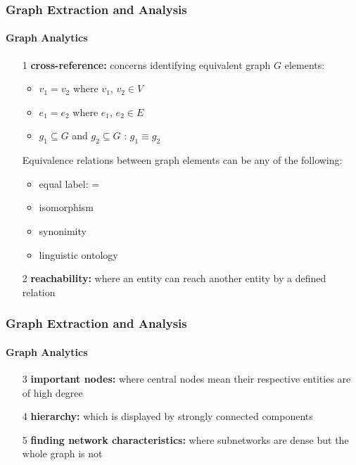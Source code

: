 \documentclass[xcolor=table]{beamer}
\begin{document}
\begin{frame}
\frametitle{Graph Extraction and Analysis}
\framesubtitle{Graph Analytics}
\begin{enumerate}
  \item[1] \textbf{cross-reference:} concerns identifying equivalent graph $G$ elements:
  \begin{itemize}
      \item $v_1 = v_2$ where $v_1$, $v_2 \in V $
      \item $e_1 = e_2$ where $e_1$, $e_2 \in E $
      \item $g_1 \subseteq  G$ and $g_2 \subseteq G$ 
      : $g_1 \equiv  g_2 $
  \end{itemize}
  Equivalence relations between graph elements can be any of the following:
  \begin{itemize}
      \item equal label: =
      \item isomorphism
      \item synonimity
      \item linguistic ontology
  \end{itemize}
  \item[2] \textbf{reachability:} where an entity can reach another entity by a defined relation  %
\end{enumerate}

\end{frame}

\begin{frame}
\frametitle{Graph Extraction and Analysis}
\framesubtitle{Graph Analytics}
\begin{enumerate}
  
  \item[3] \textbf{important nodes: }where central nodes mean their respective entities are of high degree 
   \item[4] \textbf{hierarchy: }which is displayed by strongly connected components
   \item[5] \textbf{finding network characteristics: }where subnetworks are dense but the whole graph is not
\end{enumerate}

\end{frame}
\end{document}
